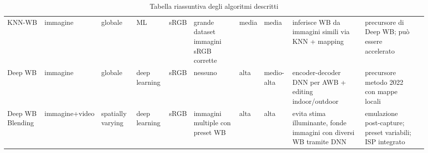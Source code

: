 \begin{table}[ht]
{\begin{tabular}{l|llllllllll}
KNN-WB & immagine & globale & ML & sRGB & grande dataset immagini sRGB corrette & media & media & inferisce WB da immagini simili via KNN + mapping & precursore di Deep WB; può essere accelerato & \cite{afifi_deep_2020} \\
Deep WB & immagine & globale & deep learning & sRGB & nessuno & alta & medio-alta & encoder-decoder DNN per AWB + editing indoor/outdoor & precursore metodo 2022 con mappe locali & \cite{afifi_deep_2020} \\
Deep WB Blending & immagine+video & spatially varying & deep learning & sRGB & immagini multiple con preset WB & alta & alta & evita stima illuminante, fonde immagini con diversi WB tramite DNN & emulazione post-capture; preset variabili; ISP integrato & \cite{afifi_auto_2022} \\
\bottomrule
\end{tabular}
}
\caption{Tabella riassuntiva degli algoritmi descritti}
\end{table}
